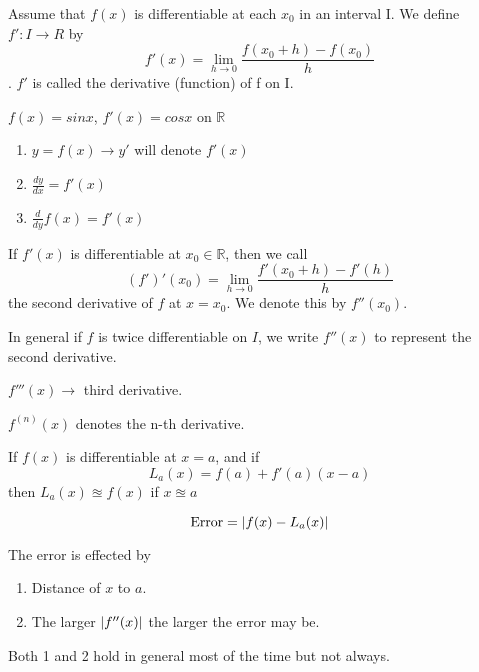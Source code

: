 

\begin{defn}
    Assume that $f(x)$ is differentiable at each $x_0$ in an interval I. We define $f': I \to R$ by \[f'(x)= \lim_{h \to 0} \frac{f(x_0+h)-f(x_0)}{h}\]. $f'$ is called the derivative (function) of f on I.
\end{defn}

\begin{exmp}
    $f(x) = sinx$, $f'(x) = cosx$ on $\mathbb{R}$
\end{exmp}


\begin{nota}\leavevmode

\begin{enumerate}
    \item $y=f(x) \to y'$ will denote $f'(x)$
    \item $\displaystyle \frac{dy}{dx} = f'(x)$
    \item $\displaystyle \frac{d}{dy} f(x) = f'(x)$
\end{enumerate}
\end{nota}

If $f'(x)$ is differentiable at $x_0\in \mathbb{R}$, then we call \[(f')'(x_0) = \lim_{h\to 0}\frac{f'(x_0+h) - f'(h)}{h}\] the second derivative of $f$ at $x=x_0$. We denote this by $f''(x_0)$.

In general if $f$ is twice differentiable on $I$, we write $f''(x)$ to represent the second derivative.

$f'''(x) \to $ third derivative.

$f^{(n)}(x)$ denotes the n-th derivative.

\begin{thm}
    If $f(x)$ is differentiable at $x=a$, and if \[L_a(x) = f(a) +f'(a)(x-a)\] then $L_a(x)\approxeq f(x)$ if $ x\approxeq a$
\end{thm}

\begin{thm}
    \[\text{Error} = \left| f(x) - L_a(x) \right|\]
    
The error is effected by
\begin{enumerate}
\item Distance of $x$ to $a$.
\item The larger $\left| f''(x) \right|$ the larger the error may be.
\end{enumerate}
Both 1 and 2 hold in general most of the time but not always.
\end{thm}

